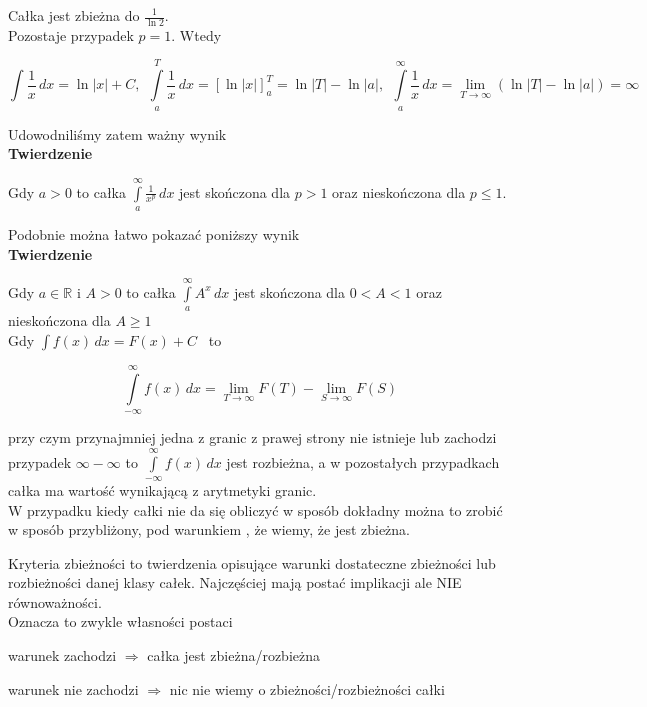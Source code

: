 Całka jest zbieżna do $ \frac{1}{\ln 2} $. \\

Pozostaje przypadek $ p = 1 $. Wtedy

$$ \int \frac{1}{x} \,dx = \ln |x| + C, \ \
\int\limits_{a}^{T} \frac{1}{x} \,dx = [\ln |x|]_a^T = \ln |T| - \ln |a|, \ \
\int\limits_{a}^{\infty} \frac{1}{x} \,dx = \lim_{T \to \infty} (\ln |T| - \ln |a|) = \infty $$

Udowodniliśmy zatem ważny wynik \\

\textbf{Twierdzenie} 

Gdy $ a > 0 $ to całka $ \int\limits_{a}^{\infty} \frac{1}{x^p} \,dx $
jest skończona dla $ p > 1 $ oraz nieskończona dla $ p \leq 1 $.

Podobnie można łatwo pokazać poniższy wynik \\

\textbf{Twierdzenie}

Gdy $ a \in \mathbb{R} $ i $ A > 0 $ to całka $ \int\limits_{a}^{\infty} A^x \,dx $
jest skończona dla $ 0 < A < 1 $ oraz nieskończona \linebreak dla $ A \geq 1 $ \\

Gdy $ \int f(x) \,dx = F(x) + C $ \ to

$$ \int\limits_{-\infty}^{\infty} f(x) \, dx = \lim_{T \to \infty} F(T) - \lim_{S \to \infty} F(S) $$

przy czym przynajmniej jedna z granic z prawej strony nie istnieje lub zachodzi przypadek 
$ \infty - \infty $ to $ \int\limits_{-\infty}^{\infty} f(x) \,dx $ jest rozbieżna, a w pozostałych
przypadkach całka ma wartość wynikającą z arytmetyki granic. \\

W przypadku kiedy całki nie da się obliczyć w sposób dokładny można to zrobić w sposób przybliżony, pod warunkiem
, że wiemy, że jest zbieżna.

Kryteria zbieżności to twierdzenia opisujące warunki dostateczne zbieżności lub rozbieżności danej klasy
całek. Najczęściej mają postać implikacji ale NIE równoważności. \\

Oznacza to zwykle własności postaci

\quad warunek zachodzi $ \Rightarrow $ całka jest zbieżna/rozbieżna

\quad warunek nie zachodzi $ \Rightarrow $ nic nie wiemy o zbieżności/rozbieżności całki

